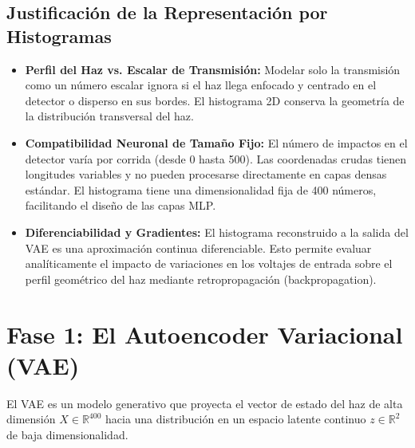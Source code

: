 \documentclass[12pt,letterpaper]{article}
\begin{document}
\subsection{Justificación de la Representación por Histogramas}
\begin{itemize}
    \item \textbf{Perfil del Haz vs. Escalar de Transmisión:} Modelar solo la transmisión como un número escalar ignora si el haz llega enfocado y centrado en el detector o disperso en sus bordes. El histograma 2D conserva la geometría de la distribución transversal del haz.
    \item \textbf{Compatibilidad Neuronal de Tamaño Fijo:} El número de impactos en el detector varía por corrida (desde 0 hasta 500). Las coordenadas crudas tienen longitudes variables y no pueden procesarse directamente en capas densas estándar. El histograma tiene una dimensionalidad fija de 400 números, facilitando el diseño de las capas MLP.
    \item \textbf{Diferenciabilidad y Gradientes:} El histograma reconstruido a la salida del VAE es una aproximación continua diferenciable. Esto permite evaluar analíticamente el impacto de variaciones en los voltajes de entrada sobre el perfil geométrico del haz mediante retropropagación (backpropagation).
\end{itemize}

\section{Fase 1: El Autoencoder Variacional (VAE)}
El VAE es un modelo generativo que proyecta el vector de estado del haz de alta dimensión $X \in \mathbb{R}^{400}$ hacia una distribución en un espacio latente continuo $z \in \mathbb{R}^2$ de baja dimensionalidad.
\end{document}
